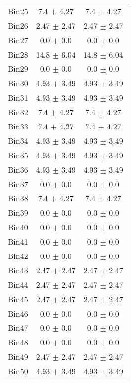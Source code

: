 \begin{tabular}{|c|c|c|}
     Bin25 & 7.4 $\pm$ 4.27 & 7.4 $\pm$ 4.27 \\ \cline{1-3} 
     Bin26 & 2.47 $\pm$ 2.47 & 2.47 $\pm$ 2.47 \\ \cline{1-3} 
     Bin27 & 0.0 $\pm$ 0.0 & 0.0 $\pm$ 0.0 \\ \cline{1-3} 
     Bin28 & 14.8 $\pm$ 6.04 & 14.8 $\pm$ 6.04 \\ \cline{1-3} 
     Bin29 & 0.0 $\pm$ 0.0 & 0.0 $\pm$ 0.0 \\ \cline{1-3} 
     Bin30 & 4.93 $\pm$ 3.49 & 4.93 $\pm$ 3.49 \\ \cline{1-3} 
     Bin31 & 4.93 $\pm$ 3.49 & 4.93 $\pm$ 3.49 \\ \cline{1-3} 
     Bin32 & 7.4 $\pm$ 4.27 & 7.4 $\pm$ 4.27 \\ \cline{1-3} 
     Bin33 & 7.4 $\pm$ 4.27 & 7.4 $\pm$ 4.27 \\ \cline{1-3} 
     Bin34 & 4.93 $\pm$ 3.49 & 4.93 $\pm$ 3.49 \\ \cline{1-3} 
     Bin35 & 4.93 $\pm$ 3.49 & 4.93 $\pm$ 3.49 \\ \cline{1-3} 
     Bin36 & 4.93 $\pm$ 3.49 & 4.93 $\pm$ 3.49 \\ \cline{1-3} 
     Bin37 & 0.0 $\pm$ 0.0 & 0.0 $\pm$ 0.0 \\ \cline{1-3} 
     Bin38 & 7.4 $\pm$ 4.27 & 7.4 $\pm$ 4.27 \\ \cline{1-3} 
     Bin39 & 0.0 $\pm$ 0.0 & 0.0 $\pm$ 0.0 \\ \cline{1-3} 
     Bin40 & 0.0 $\pm$ 0.0 & 0.0 $\pm$ 0.0 \\ \cline{1-3} 
     Bin41 & 0.0 $\pm$ 0.0 & 0.0 $\pm$ 0.0 \\ \cline{1-3} 
     Bin42 & 0.0 $\pm$ 0.0 & 0.0 $\pm$ 0.0 \\ \cline{1-3} 
     Bin43 & 2.47 $\pm$ 2.47 & 2.47 $\pm$ 2.47 \\ \cline{1-3} 
     Bin44 & 2.47 $\pm$ 2.47 & 2.47 $\pm$ 2.47 \\ \cline{1-3} 
     Bin45 & 2.47 $\pm$ 2.47 & 2.47 $\pm$ 2.47 \\ \cline{1-3} 
     Bin46 & 0.0 $\pm$ 0.0 & 0.0 $\pm$ 0.0 \\ \cline{1-3} 
     Bin47 & 0.0 $\pm$ 0.0 & 0.0 $\pm$ 0.0 \\ \cline{1-3} 
     Bin48 & 0.0 $\pm$ 0.0 & 0.0 $\pm$ 0.0 \\ \cline{1-3} 
     Bin49 & 2.47 $\pm$ 2.47 & 2.47 $\pm$ 2.47 \\ \cline{1-3} 
     Bin50 & 4.93 $\pm$ 3.49 & 4.93 $\pm$ 3.49 \\ \cline{1-3} 

\end{tabular}
